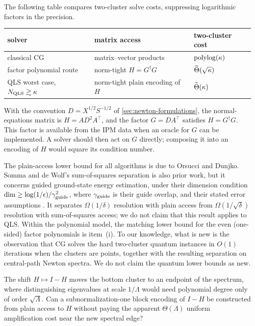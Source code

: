 The following table compares two-cluster solve costs, suppressing
logarithmic factors in the precision.
\begin{center}
\begin{tabular}{@{}lll@{}}
\toprule
solver & matrix access & two-cluster cost \\
\midrule
classical CG & matrix--vector products & $\operatorname{polylog}(\kappa)$ \\
factor polynomial route\footnotemark & norm-tight $H=G^\dagger G$
 & $\widetilde{\Theta}(\sqrt\kappa)$ \\
QLS worst case, $N_{\rm QLS}\gtrsim\kappa$
 & norm-tight plain encoding of $H$ & $\widetilde{\Theta}(\kappa)$ \\
\bottomrule
\end{tabular}
\end{center}
With the convention $D=X^{1/2}S^{-1/2}$ of
\cref{sec:newton-formulations}, the normal-equations matrix is
$H=AD^2A^\top$, and the factor $G=DA^\top$ satisfies $H=G^\dagger G$.  This
factor is available from the IPM data when an oracle for $G$ can be
implemented.  A solver should then act on
$G$ directly; composing it into an encoding of $H$ would square its
condition number.

The plain-access lower bound for all algorithms is due to Orsucci and
Dunjko.  Somma and de Wolf's sum-of-squares separation is also prior work,
but it concerns guided ground-state energy estimation, under their dimension
condition
$\dim\geq\log(1/\epsilon)/\gamma_{\rm guide}^2$, where
$\gamma_{\rm guide}$ is their guide overlap, and their stated error assumptions
\cite{somma2026-optimal-lower-bound-ground-state-energy}.  It separates
$\Omega(1/\delta)$ resolution with plain access from
$\Omega(1/\sqrt\delta)$ resolution with sum-of-squares access; we do not claim
that this result applies to QLS.  Within the polynomial model, the matching
lower bound for the even (one-sided) factor polynomials is item~\textup{(i)}.
To our knowledge, what is new is the observation that CG solves the hard
two-cluster quantum instances in $O(1)$ iterations when the clusters are
points, together with the resulting separation on central-path Newton
spectra.  We do not claim the quantum lower bounds as new.

\begin{openproblem}
\label{open:exact-subnormalization-shift}
The shift $H\mapsto I-H$ moves the bottom cluster to an endpoint of the
spectrum, where distinguishing eigenvalues at scale $1/\Lambda$ would need
polynomial degree only of order $\sqrt\Lambda$.
Can a subnormalization-one block encoding of $I-H$ be constructed from plain
access to $H$ without paying the apparent $\Theta(\Lambda)$ uniform
amplification cost near the new spectral edge?
\end{openproblem}

